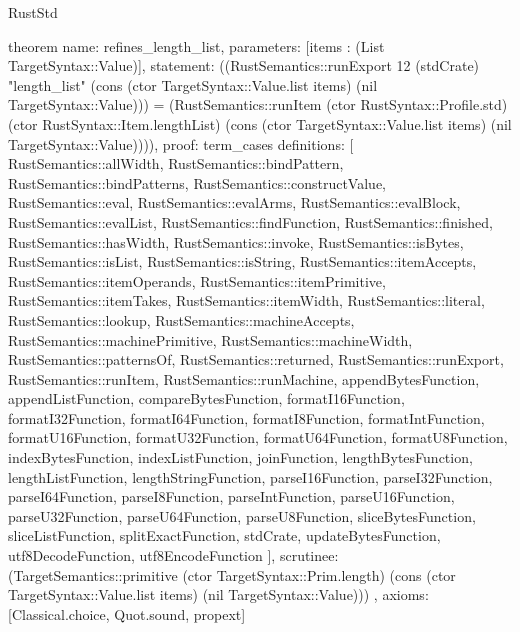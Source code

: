 \begin{lexlean}{RustStd}
\begin{semanticmodule}
theorem{
  name: refines_length_list,
  parameters: [items : (List TargetSyntax::Value)],
  statement: ((RustSemantics::runExport 12 (stdCrate) "length_list" (cons (ctor TargetSyntax::Value.list items) (nil TargetSyntax::Value))) = (RustSemantics::runItem (ctor RustSyntax::Profile.std) (ctor RustSyntax::Item.lengthList) (cons (ctor TargetSyntax::Value.list items) (nil TargetSyntax::Value)))),
  proof: term_cases{
    definitions: [
      RustSemantics::allWidth,
      RustSemantics::bindPattern,
      RustSemantics::bindPatterns,
      RustSemantics::constructValue,
      RustSemantics::eval,
      RustSemantics::evalArms,
      RustSemantics::evalBlock,
      RustSemantics::evalList,
      RustSemantics::findFunction,
      RustSemantics::finished,
      RustSemantics::hasWidth,
      RustSemantics::invoke,
      RustSemantics::isBytes,
      RustSemantics::isList,
      RustSemantics::isString,
      RustSemantics::itemAccepts,
      RustSemantics::itemOperands,
      RustSemantics::itemPrimitive,
      RustSemantics::itemTakes,
      RustSemantics::itemWidth,
      RustSemantics::literal,
      RustSemantics::lookup,
      RustSemantics::machineAccepts,
      RustSemantics::machinePrimitive,
      RustSemantics::machineWidth,
      RustSemantics::patternsOf,
      RustSemantics::returned,
      RustSemantics::runExport,
      RustSemantics::runItem,
      RustSemantics::runMachine,
      appendBytesFunction,
      appendListFunction,
      compareBytesFunction,
      formatI16Function,
      formatI32Function,
      formatI64Function,
      formatI8Function,
      formatIntFunction,
      formatU16Function,
      formatU32Function,
      formatU64Function,
      formatU8Function,
      indexBytesFunction,
      indexListFunction,
      joinFunction,
      lengthBytesFunction,
      lengthListFunction,
      lengthStringFunction,
      parseI16Function,
      parseI32Function,
      parseI64Function,
      parseI8Function,
      parseIntFunction,
      parseU16Function,
      parseU32Function,
      parseU64Function,
      parseU8Function,
      sliceBytesFunction,
      sliceListFunction,
      splitExactFunction,
      stdCrate,
      updateBytesFunction,
      utf8DecodeFunction,
      utf8EncodeFunction
    ],
    scrutinee: (TargetSemantics::primitive (ctor TargetSyntax::Prim.length) (cons (ctor TargetSyntax::Value.list items) (nil TargetSyntax::Value)))
  },
  axioms: [Classical.choice, Quot.sound, propext]
}


\end{semanticmodule}
\end{lexlean}
